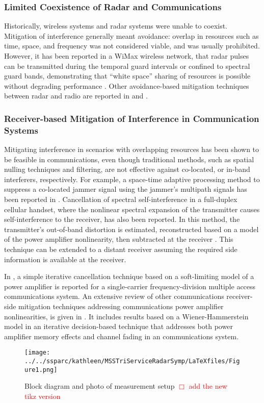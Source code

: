 \documentclass[11pt,onecolumn]{IEEEtran}
\begin{document}
\subsubsection{Limited Coexistence of Radar and Communications}
Historically, wireless systems and radar systems were unable to coexist.  Mitigation of interference generally meant avoidance:  overlap in resources such as time, space, and frequency was not considered viable, and was usually prohibited.  However, it has been reported in a WiMax wireless network, that radar pulses can be transmitted during the temporal guard intervals or confined to spectral guard bands, demonstrating that ``white space'' sharing of resources is possible without degrading performance \cite{Cohen10}.  Other avoidance-based mitigation techniques between radar and radio are reported in \cite{Lackpour} and \cite{WiMAXForum}.  

\subsubsection{Receiver-based Mitigation of Interference in Communication Systems} 
Mitigating interference in scenarios with overlapping resources has been shown to be feasible in communications, even though traditional methods, such as spatial nulling techniques and filtering, are not effective against co-located, or in-band interferers, respectively.  For example, a space-time adaptive processing method to suppress a co-located jammer signal using the jammer's multipath signals has been reported in \cite{Kogon}.  Cancellation of spectral self-interference in a full-duplex cellular handset, where the nonlinear spectral expansion of the transmitter causes self-interference to the receiver, has also been reported.  In this method, the transmitter's out-of-band distortion is estimated, reconstructed based on a model of the power amplifier nonlinearity, then subtracted at the receiver \cite{Omer}.  This technique can be extended to a distant receiver assuming the required side information is available at the receiver.  \par
In \cite{Gazda}, a simple iterative cancellation technique based on a soft-limiting model of a power amplifier is reported for a single-carrier frequency-division multiple access communications system.  An extensive review of other communications receiver-side mitigation techniques addressing communications power amplifier nonlinearities, is given in \cite{Gregorio}.  It includes results based on a Wiener-Hammerstein model in an iterative decision-based technique that addresses both power amplifier memory effects and channel fading in an \OFDM communications system.
\begin{figure*}[t!]   %
\centering
\texttt{[image: ../../ssparc/kathleen/MSSTriServiceRadarSymp/LaTeXfiles/Figure1.png]}  %
\caption{Block diagram and photo of measurement setup \textcolor{red}{$\Box$ add the new tikz version}}
\label{fig_sim}
\end{figure*}
\end{document}

